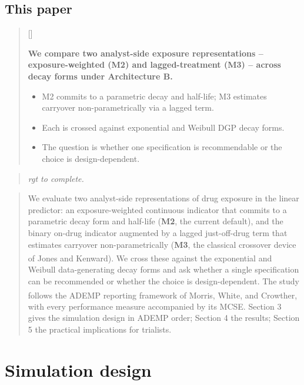 \documentclass[
  11pt,
]{article}
\newcounter{pgraph}
\newenvironment{bullets}{%
  \stepcounter{pgraph}%
  \begin{quote}\small\sffamily\color[gray]{0.30}%
  {\normalfont\scriptsize\color[gray]{0.58}[\thepgraph]\enspace}}{%
  \end{quote}}
\newenvironment{rgt}{%
  \begin{quote}\small\itshape\color[RGB]{20,60,160}}{%
  \end{quote}}
\newenvironment{orig}{%
  \begin{quote}\normalsize\color[gray]{0.55}}{%
  \end{quote}}
\begin{document}
\subsection{This paper}\label{this-paper}

\begin{bullets}

\textbf{We compare two analyst-side exposure representations --
exposure-weighted (M2) and lagged-treatment (M3) -- across decay
forms under Architecture B.}

\begin{itemize}\setlength{\itemsep}{2pt}\setlength{\parskip}{0pt}
\item M2 commits to a parametric decay and half-life; M3 estimates
carryover non-parametrically via a lagged term.
\item Each is crossed against exponential and Weibull DGP decay
forms.
\item The question is whether one specification is recommendable or
the choice is design-dependent.
\end{itemize}

\end{bullets}

\begin{rgt}
rgt to complete.

\end{rgt}

\begin{orig}
We evaluate two analyst-side representations of drug exposure in the
linear predictor: an exposure-weighted continuous indicator that
commits to a parametric decay form and half-life (\textbf{M2}, the
current default), and the binary on-drug indicator augmented by a
lagged just-off-drug term that estimates carryover non-parametrically
(\textbf{M3}, the classical crossover device of Jones and Kenward\textsuperscript{}). We cross these against the exponential and
Weibull data-generating decay forms and ask whether a single
specification can be recommended or whether the choice is
design-dependent. The study follows the ADEMP reporting framework of
Morris, White, and Crowther\textsuperscript{}, with every
performance measure accompanied by its MCSE. Section 3 gives the
simulation design in ADEMP order; Section 4 the results; Section 5
the practical implications for trialists.

\end{orig}

\section{Simulation design}\label{simulation-design}
\end{document}

